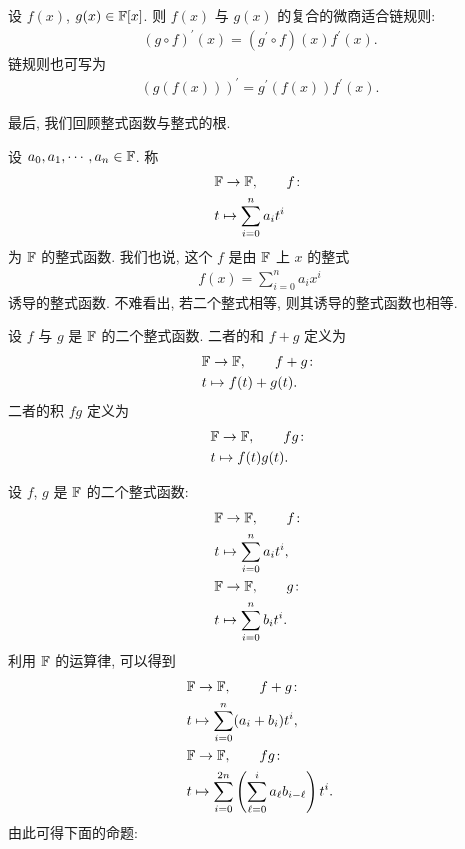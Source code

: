 \begin{proposition}
    设 $f(x)$, $g(x) \in \mathbb{F}[x]$. 则 $f(x)$ 与 $g(x)$ 的复合的微商适合链规则:
    \begin{align*}
        (g \circ f)^{\prime} (x) = (g^{\prime} \circ f)(x) f^{\prime} (x).
    \end{align*}
    链规则也可写为
    \begin{align*}
        (g(f(x)))^{\prime} = g^{\prime} (f(x)) f^{\prime} (x).
    \end{align*}
\end{proposition}

最后, 我们回顾整式函数与整式的根.

\begin{definition}
    设 $a_0, a_1, \cdots, a_n \in \mathbb{F}$. 称
    \begin{align*}
         & \mathbb{F} \to \mathbb{F}, \tag*{$f \colon$}   \\
         & t \mapsto \sum_{i = 0}^n a_i t^i
    \end{align*}
    为 $\mathbb{F}$ 的整式函数. 我们也说, 这个 $f$ 是由 $\mathbb{F}$ 上 $x$ 的整式
    \begin{align*}
        f(x) = \sum_{i = 0}^n a_i x^i
    \end{align*}
    诱导的整式函数. 不难看出, 若二个整式相等, 则其诱导的整式函数也相等.
\end{definition}

\begin{definition}
    设 $f$ 与 $g$ 是 $\mathbb{F}$ 的二个整式函数. 二者的和 $f+g$ 定义为
    \begin{align*}
         & \mathbb{F} \to \mathbb{F}, \tag*{$f+g \colon$} \\
         & t \mapsto f(t) + g(t).
    \end{align*}
    二者的积 $fg$ 定义为
    \begin{align*}
         & \mathbb{F} \to \mathbb{F}, \tag*{$fg \colon$} \\
         & t \mapsto f(t) g(t).
    \end{align*}
\end{definition}

设 $f$, $g$ 是 $\mathbb{F}$ 的二个整式函数:
\begin{align*}
     & \mathbb{F} \to \mathbb{F}, \tag*{$f \colon$}  \\
     & t \mapsto \sum_{i=0}^n a_i t^i, \\
     & \mathbb{F} \to \mathbb{F}, \tag*{$g \colon$}  \\
     & t \mapsto \sum_{i=0}^n b_i t^i.
\end{align*}
利用 $\mathbb{F}$ 的运算律, 可以得到
\begin{align*}
     & \mathbb{F} \to \mathbb{F}, \tag*{$f+g \colon$}                                                  \\
     & t \mapsto \sum_{i=0}^n (a_i + b_i) t^i,                                           \\
     & \mathbb{F} \to \mathbb{F}, \tag*{$fg \colon$}                                                   \\
     & t \mapsto \sum_{i=0}^{2n} \left( \sum_{\ell=0}^{i} a_\ell b_{i-\ell} \right) t^i.
\end{align*}
由此可得下面的命题:

